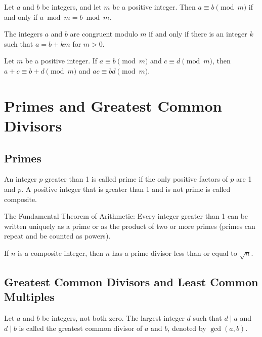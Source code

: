 \documentclass{article}
\begin{document}
\begin{theorem}
    Let \( a \) and \( b \) be integers, and let \( m \) be a positive integer. Then \( a \equiv b \pmod{m} \) if and only if \( a \bmod m = b \bmod m \).
\end{theorem}

\begin{theorem}
    The integers \( a \) and \( b \) are congruent modulo \( m \) if and only if there is an integer \( k \) such that \( a = b + km \) for \( m > 0 \).
\end{theorem}

\begin{theorem}
    Let \( m \) be a positive integer. If \( a \equiv b \pmod{m} \) and \( c \equiv d \pmod{m} \), then \( a + c \equiv b + d \pmod{m} \) and \( ac \equiv bd \pmod{m} \).
\end{theorem}

\section{Primes and Greatest Common Divisors}
\subsection{Primes}
\begin{proposition}
    An integer \( p \) greater than 1 is called prime if the only positive factors of \( p \) are 1 and \( p \). 
    A positive integer that is greater than 1 and is not prime is called composite.
\end{proposition}

\begin{theorem}
    The Fundamental Theorem of Arithmetic: Every integer greater than 1 can be written uniquely as a prime or as the product of two or more primes 
    (primes can repeat and be counted as powers).
\end{theorem}

\begin{theorem}
    If \( n \) is a composite integer, then \( n \) has a prime divisor less than or equal to \( \sqrt{n} \).
\end{theorem}

\subsection{Greatest Common Divisors and Least Common Multiples}
\begin{definition}
    Let \( a \) and \( b \) be integers, not both zero. The largest integer \( d \) such that \( d \mid a \) and \( d \mid b \) is called the greatest common divisor of \( a \) and \( b \), denoted by \( \gcd(a, b) \).
\end{definition}
\end{document}
